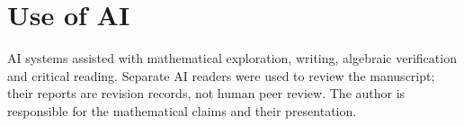 \section*{Use of AI}
AI systems assisted with mathematical exploration, writing,
algebraic verification and critical reading. Separate AI readers
were used to review the manuscript; their reports are revision
records, not human peer review. The author is responsible for the
mathematical claims and their presentation.
